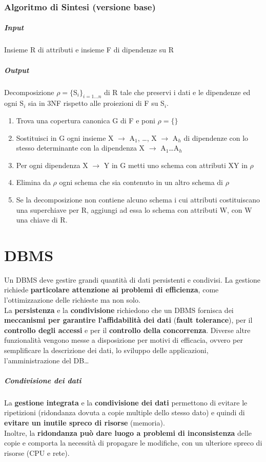 \documentclass[10pt]{book}
\begin{document}
\subsection{Algoritmo di Sintesi (versione base)}
\paragraph{Input} Insieme R di attributi e insieme F di dipendenze su R
\paragraph{Output} Decomposizione $\rho = \{$S$_i\}_{i=1\ldots n}$ di R tale che preservi i dati e le dipendenze ed ogni S$_i$ sia in 3NF rispetto alle proiezioni di F su S$_i$.
\begin{enumerate}
	\item Trova una copertura canonica G di F e poni $\rho = \{\}$
	\item Sostituisci in G ogni insieme X $\rightarrow$ A$_1$, \ldots, X $\rightarrow$ A$_h$ di dipendenze con lo stesso determinante con la dipendenza X $\rightarrow$ A$_1$\ldots A$_h$
	\item Per ogni dipendenza X $\rightarrow$ Y in G metti uno schema con attributi XY in $\rho$
	\item Elimina da $\rho$ ogni schema che sia contenuto in un altro schema di $\rho$
	\item Se la decomposizione non contiene alcuno schema i cui attributi costituiscano una superchiave per R, aggiungi ad essa lo schema con attributi W, con W una chiave di R.
\end{enumerate}
\chapter{DBMS}
Un DBMS deve gestire grandi quantità di dati persistenti e condivisi. La gestione richiede \textbf{particolare attenzione ai problemi di efficienza}, come l'ottimizzazione delle richieste ma non solo.\\
La \textbf{persistenza} e la \textbf{condivisione} richiedono che un DBMS fornisca dei \textbf{meccanismi per garantire l'affidabilità dei dati} (\textbf{fault tolerance}), per il \textbf{controllo degli accessi} e per il \textbf{controllo della concorrenza}. Diverse altre funzionalità vengono messe a disposizione per motivi di efficacia, ovvero per semplificare la descrizione dei dati, lo sviluppo delle applicazioni, l'amministrazione del DB\ldots
\paragraph{Condivisione dei dati} La \textbf{gestione integrata} e la \textbf{condivisione dei dati} permettono di evitare le ripetizioni (ridondanza dovuta a copie multiple dello stesso dato) e quindi di \textbf{evitare un inutile spreco di risorse} (memoria).\\
Inoltre, la \textbf{ridondanza può dare luogo a problemi di inconsistenza} delle copie e comporta la necessità di propagare le modifiche, con un ulteriore spreco di risorse (CPU e rete).
\end{document}
